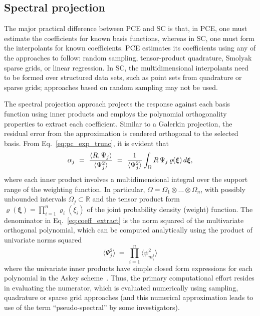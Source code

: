 \subsection{Spectral projection} \label{uq:expansion:spectral}

The major practical difference between PCE and SC is that, in PCE, one
must estimate the coefficients for known basis functions, whereas in
SC, one must form the interpolants for known coefficients.  PCE
estimates its coefficients using any of the approaches to follow:
random sampling, tensor-product quadrature, Smolyak sparse grids, or
linear regression.  In SC, the multidimensional interpolants need to
be formed over structured data sets, such as point sets from
quadrature or sparse grids; approaches based on random sampling may
not be used.

The spectral projection approach
projects the response against each basis function using inner products
and employs the polynomial orthogonality properties to extract each
coefficient.  Similar to a Galerkin projection, the residual error
from the approximation is rendered orthogonal to the selected basis.
From Eq.~\ref{eq:pc_exp_trunc}, it is evident that
\begin{equation}
\alpha_j ~=~ \frac{\langle R, \Psi_j \rangle}{\langle \Psi^2_j \rangle}
~=~ {1\over {\langle \Psi^2_j \rangle}}
 \int_{\Omega} R\, \Psi_j\, \varrho(\boldsymbol{\xi}) \,d\boldsymbol{\xi},
\label{eq:coeff_extract}
\end{equation}
where each inner product involves a multidimensional integral over
the support range of the weighting function.  In particular, 
$\Omega = \Omega_1\otimes\dots\otimes\Omega_n$, with possibly
unbounded intervals $\Omega_j\subset\mathbb{R}$ and the tensor product 
form $\varrho(\boldsymbol{\xi}) = \prod_{i=1}^n \varrho_i(\xi_i)$ 
of the joint probability density (weight) function.  The denominator 
in Eq.~\ref{eq:coeff_extract} is the norm squared of the multivariate
orthogonal polynomial, which can be computed analytically using the
product of univariate norms squared
\begin{equation}
\langle \Psi^2_j \rangle ~=~ \prod_{i=1}^{n} \langle \psi_{m_i^j}^2 \rangle
\label{eq:norm_squared}
\end{equation}
where the univariate inner products have simple closed form
expressions for each polynomial in the Askey
scheme~\cite{abram_stegun}. Thus, the primary computational effort
resides in evaluating the numerator, which is evaluated numerically
using sampling, quadrature or sparse grid approaches (and this
numerical approximation leads to use of the term ``pseudo-spectral''
by some investigators).


